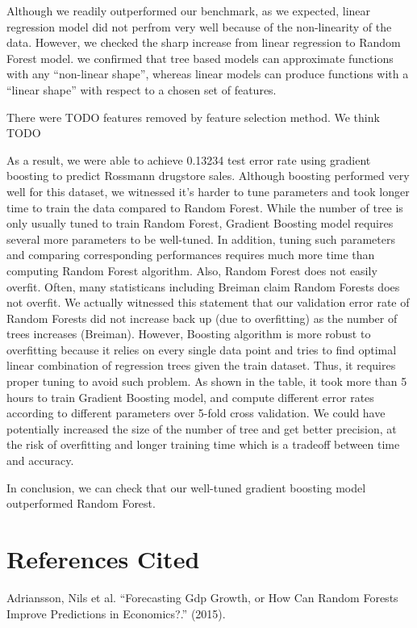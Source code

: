 \documentclass[letterpaper,twocolumn,11pt]{article}
\begin{document}
Although we readily outperformed our benchmark, as we expected, linear regression model did not perfrom very well because of the non-linearity of the data. However, we checked the sharp increase from linear regression to Random Forest model. we confirmed that tree based models can approximate functions with any ``non-linear shape'', whereas linear models can produce functions with a ``linear shape'' with respect to a chosen set of features. 

There were TODO features removed by feature selection method. We think TODO 

As a result, we were able to achieve 0.13234 test error rate using gradient boosting to predict Rossmann drugstore sales. Although boosting performed very well for this dataset, we witnessed it's harder to tune parameters and took longer time to train the data compared to Random Forest. While the number of tree is only usually tuned to train Random Forest, Gradient Boosting model requires several more parameters to be well-tuned. In addition, tuning such parameters and comparing corresponding performances requires much more time than computing Random Forest algorithm. Also, Random Forest does not easily overfit. Often, many statisticans including Breiman claim Random Forests does not overfit. We actually witnessed this statement that our validation error rate of Random Forests did not increase back up (due to overfitting) as the number of trees increases (Breiman). However, Boosting algorithm is more robust to overfitting because it relies on every single data point and tries to find optimal linear combination of regression trees given the train dataset. Thus, it requires proper tuning to avoid such problem. As shown in the table, it took more than 5 hours to train Gradient Boosting model, and compute different error rates according to different parameters over 5-fold cross validation. We could have potentially increased the size of the number of tree and get better precision, at the risk of overfitting and longer training time which is a tradeoff between time and accuracy.

In conclusion, we can check that our well-tuned gradient boosting model outperformed Random Forest. 

\section{References Cited}

Adriansson, Nils et al. “Forecasting Gdp Growth, or How Can Random Forests Improve Predictions in Economics?.” (2015).
\end{document}

